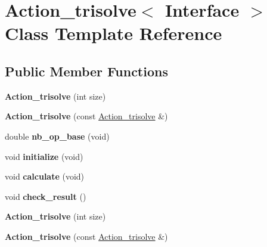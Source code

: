 \hypertarget{class_action__trisolve}{}\section{Action\+\_\+trisolve$<$ Interface $>$ Class Template Reference}
\label{class_action__trisolve}
\subsection*{Public Member Functions}
\begin{DoxyCompactItemize}
\item 
\mbox{\label{class_action__trisolve_a039e3af9b79755743efeee9df2b8fa5b}} 
{\bfseries Action\+\_\+trisolve} (int size)
\item 
\mbox{\label{class_action__trisolve_a4070c4051909a9b13816bf2ccaf1905f}} 
{\bfseries Action\+\_\+trisolve} (const \hyperlink{class_action__trisolve}{Action\+\_\+trisolve} \&)
\item 
\mbox{\label{class_action__trisolve_aaaf95ebe1bb7a4cd02407da30b8a3b58}} 
double {\bfseries nb\+\_\+op\+\_\+base} (void)
\item 
\mbox{\label{class_action__trisolve_ab8ee57f7968ec0179baf8bed14e11fb3}} 
void {\bfseries initialize} (void)
\item 
\mbox{\label{class_action__trisolve_a546634b95c4b3667c3941d9999c1bfee}} 
void {\bfseries calculate} (void)
\item 
\mbox{\label{class_action__trisolve_ae3b508af127fe2e99fb3f7fe5c71ad21}} 
void {\bfseries check\+\_\+result} ()
\item 
\mbox{\label{class_action__trisolve_a039e3af9b79755743efeee9df2b8fa5b}} 
{\bfseries Action\+\_\+trisolve} (int size)
\item 
\mbox{\label{class_action__trisolve_a4070c4051909a9b13816bf2ccaf1905f}} 
{\bfseries Action\+\_\+trisolve} (const \hyperlink{class_action__trisolve}{Action\+\_\+trisolve} \&)

\end{DoxyCompactItemize}

